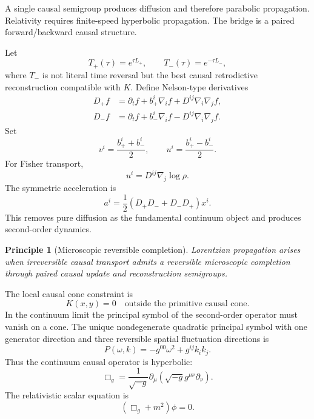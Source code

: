 \documentclass[11pt]{article}
\newtheorem{principle}[definition]{Principle}
\begin{document}
A single causal semigroup produces diffusion and therefore parabolic propagation. Relativity requires finite-speed hyperbolic propagation. The bridge is a paired forward/backward causal structure.

Let
\begin{equation}
T_+(\tau)=e^{\tau L_+},\qquad T_-(\tau)=e^{-\tau L_-},
\end{equation}
where $T_-$ is not literal time reversal but the best causal retrodictive reconstruction compatible with $K$.
Define Nelson-type derivatives
\begin{align}
D_+f&=\partial_tf+b_+^i\nabla_if+D^{ij}\nabla_i\nabla_j f,\\
D_-f&=\partial_tf+b_-^i\nabla_if-D^{ij}\nabla_i\nabla_j f.
\end{align}
Set
\begin{equation}
 v^i=\frac{b_+^i+b_-^i}{2},\qquad u^i=\frac{b_+^i-b_-^i}{2}.
\end{equation}
For Fisher transport,
\begin{equation}
 u^i=D^{ij}\nabla_j\log\rho.
\end{equation}
The symmetric acceleration is
\begin{equation}
 a^i=\frac12(D_+D_-+D_-D_+)x^i.
\end{equation}
This removes pure diffusion as the fundamental continuum object and produces second-order dynamics.

\begin{principle}[Microscopic reversible completion]
Lorentzian propagation arises when irreversible causal transport admits a reversible microscopic completion through paired causal update and reconstruction semigroups.
\end{principle}

The local causal cone constraint is
\begin{equation}
K(x,y)=0\quad\text{outside the primitive causal cone}.
\end{equation}
In the continuum limit the principal symbol of the second-order operator must vanish on a cone. The unique nondegenerate quadratic principal symbol with one generator direction and three reversible spatial fluctuation directions is
\begin{equation}
P(\omega,k)=-g^{00}\omega^2+g^{ij}k_ik_j.
\end{equation}
Thus the continuum causal operator is hyperbolic:
\begin{equation}
\boxed{\Box_g=\frac{1}{\sqrt{-g}}\partial_\mu\left(\sqrt{-g}g^{\mu\nu}\partial_\nu\right).}
\end{equation}
The relativistic scalar equation is
\begin{equation}
(\Box_g+m^2)\phi=0.
\end{equation}
\end{document}

